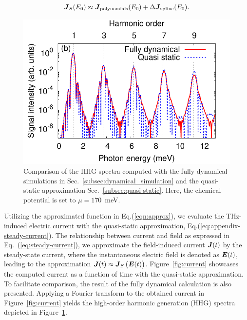\begin{align}
\boldsymbol J_S(E_0)\approx \boldsymbol{J}_{\mathrm{polynomials }}(E_0)+\Delta \boldsymbol{J}_{\mathrm{spline}}(E_0).
\label{eqn:approx}
\end{align}

\begin{figure}[htb]
    \centering
\includegraphics[width=0.8\linewidth]{pic/hhg_qstatic.pdf}
\caption{\label{fig:hhg_qstatic} 
Comparison of the HHG spectra computed with the fully dynamical simulations in Sec.~\ref{subsec:dynamical_simulation} and the quasi-static approximation Sec.~\ref{subsec:quasi-static}. Here, the chemical potential is set to $\mu =170$~meV.}
\end{figure}

Utilizing the approximated function in Eq.(\ref{eqn:approx}), we evaluate the THz-induced electric
current with the quasi-static approximation, Eq.(\ref{eq:appendix-steady-current}).
The relationship between current and field as expressed in Eq.~(\ref{eq:steady-current}), we approximate the field-induced current $\boldsymbol J(t)$ by the steady-state current, where the instantaneous electric field is denoted as $\boldsymbol E(t)$, leading to the approximation $\boldsymbol J(t)\approx \boldsymbol J_S\left( \boldsymbol E(t) \right)$.
Figure~\ref{fig:current} showcases the computed current as a function of time with the quasi-static
approximation. To facilitate comparison, the result of the fully dynamical calculation is also
presented. Applying a Fourier transform to the obtained current in Figure~\ref{fig:current} yields
the high-order harmonic generation (HHG) spectra depicted in Figure~\ref{fig:hhg_qstatic}.

